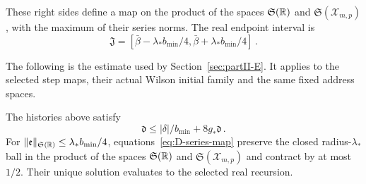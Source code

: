 These right sides define a map on the product of the spaces $\mathfrak S(\mathbb{R})$ and $\mathfrak S(\mathcal X_{m,p})$, with the maximum of their series norms. The real endpoint interval is
\begin{equation*}
\mathfrak J=[\bar\beta-\lambda_*b_{\min}/4,\bar\beta+\lambda_*b_{\min}/4]\,.
\end{equation*}

\begin{samepage}
The following is the estimate used by Section~\ref{sec:partII-E}. It applies to the selected step maps, their actual Wilson initial family and the same fixed address spaces.
\begin{lemma}\label{lem:D-E1}
The histories above satisfy
\begin{equation*}
\mathfrak d\le |\delta|/b_{\min}+8g_*\mathfrak d\,.
\end{equation*}
For $\|\mathfrak e\|_{\mathfrak S(\mathbb{R})}\le\lambda_*b_{\min}/4$, equations~\eqref{eq:D-series-map} preserve the closed radius-$\lambda_*$ ball in the product of the spaces $\mathfrak S(\mathbb{R})$ and $\mathfrak S(\mathcal X_{m,p})$ and contract by at most $1/2$. Their unique solution evaluates to the selected real recursion.
\end{lemma}
\end{samepage}
